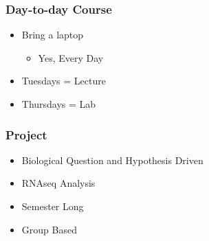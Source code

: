 \documentclass[14pt]{beamer}
\begin{document}
\begin{frame}
\frametitle{Day-to-day Course}
\begin{itemize}
\item<1-> Bring a laptop
\begin{itemize}
	\item<2-> Yes, Every Day
\end{itemize}
\item<3-> Tuesdays = Lecture
\item<4-> Thursdays = Lab
\end{itemize}
\end{frame}
\begin{frame}
\frametitle{Project}
\begin{itemize}
	\item<1-> Biological Question and Hypothesis Driven
	\item<2-> RNAseq Analysis
	\item<3-> Semester Long
	\item<4-> Group Based
\end{itemize}

\end{frame}
\end{document}
